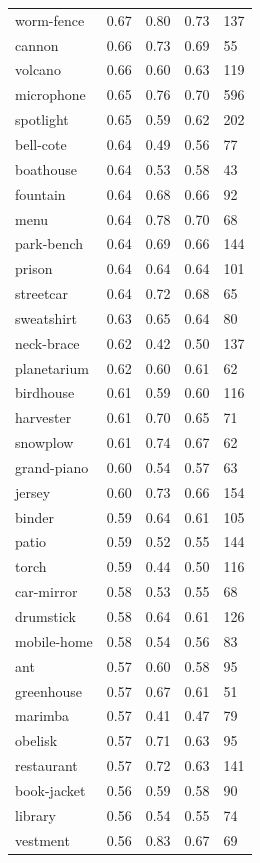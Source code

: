 \begin{center}
\begin{longtable}{lllll}
worm-fence & 0.67 & 0.80 & 0.73 & 137 \\
cannon & 0.66 & 0.73 & 0.69 & 55 \\
volcano & 0.66 & 0.60 & 0.63 & 119 \\
microphone & 0.65 & 0.76 & 0.70 & 596 \\
spotlight & 0.65 & 0.59 & 0.62 & 202 \\
bell-cote & 0.64 & 0.49 & 0.56 & 77 \\
boathouse & 0.64 & 0.53 & 0.58 & 43 \\
fountain & 0.64 & 0.68 & 0.66 & 92 \\
menu & 0.64 & 0.78 & 0.70 & 68 \\
park-bench & 0.64 & 0.69 & 0.66 & 144 \\
prison & 0.64 & 0.64 & 0.64 & 101 \\
streetcar & 0.64 & 0.72 & 0.68 & 65 \\
sweatshirt & 0.63 & 0.65 & 0.64 & 80 \\
neck-brace & 0.62 & 0.42 & 0.50 & 137 \\
planetarium & 0.62 & 0.60 & 0.61 & 62 \\
birdhouse & 0.61 & 0.59 & 0.60 & 116 \\
harvester & 0.61 & 0.70 & 0.65 & 71 \\
snowplow & 0.61 & 0.74 & 0.67 & 62 \\
grand-piano & 0.60 & 0.54 & 0.57 & 63 \\
jersey & 0.60 & 0.73 & 0.66 & 154 \\
binder & 0.59 & 0.64 & 0.61 & 105 \\
patio & 0.59 & 0.52 & 0.55 & 144 \\
torch & 0.59 & 0.44 & 0.50 & 116 \\
car-mirror & 0.58 & 0.53 & 0.55 & 68 \\
drumstick & 0.58 & 0.64 & 0.61 & 126 \\
mobile-home & 0.58 & 0.54 & 0.56 & 83 \\
ant & 0.57 & 0.60 & 0.58 & 95 \\
greenhouse & 0.57 & 0.67 & 0.61 & 51 \\
marimba & 0.57 & 0.41 & 0.47 & 79 \\
obelisk & 0.57 & 0.71 & 0.63 & 95 \\
restaurant & 0.57 & 0.72 & 0.63 & 141 \\
book-jacket & 0.56 & 0.59 & 0.58 & 90 \\
library & 0.56 & 0.54 & 0.55 & 74 \\
vestment & 0.56 & 0.83 & 0.67 & 69 \\

\end{longtable}
\end{center}
